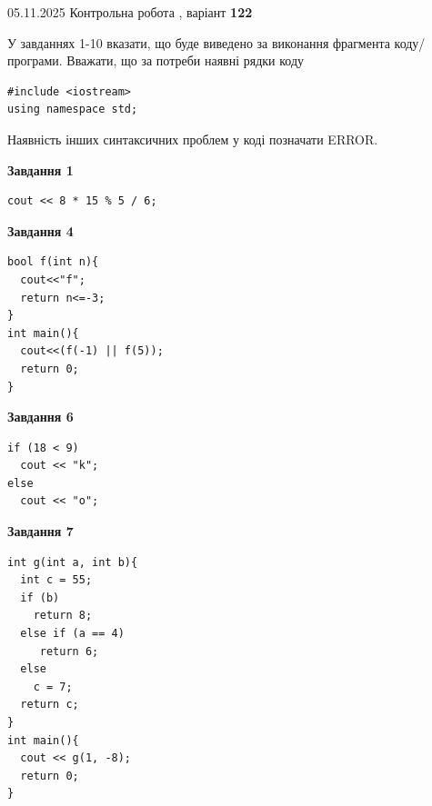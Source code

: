 \documentclass[12pt, ukrainian]{article}
\begin{document}
{\Large{05.11.2025 Контрольна робота , варіант  \No \textbf { 122 }\par}}
{
\begin {large}
У завданнях 1-10 вказати, що буде виведено за виконання фрагмента коду/про\-гра\-ми.
Вважати, що за потреби наявні рядки коду
\begin{verbatim}
#include <iostream>
using namespace std;
\end{verbatim}
Наявність інших синтаксичних проблем у коді позначати ERROR.

\begin{minipage}[t]{7.0cm}

\begin{center}
\textbf{Завдання 1}
\end{center}
\vspace{-8mm}

\begin{verbatim}
cout << 8 * 15 % 5 / 6;
\end{verbatim}



\begin{center}
\textbf{Завдання 4}
\end{center}
\vspace{-8mm}

\begin{verbatim}
bool f(int n){
  cout<<"f";
  return n<=-3;
}
int main(){
  cout<<(f(-1) || f(5));
  return 0;
}
\end{verbatim}



\begin{center}
\textbf{Завдання 6}
\end{center}
\vspace{-8mm}

\begin{verbatim}
if (18 < 9)
  cout << "k";
else
  cout << "o";
\end{verbatim}



\begin{center}
\textbf{Завдання 7}
\end{center}
\vspace{-8mm}

\begin{verbatim}
int g(int a, int b){
  int c = 55;
  if (b)
    return 8;
  else if (a == 4)
     return 6;
  else
    c = 7;
  return c;
}
int main(){
  cout << g(1, -8);
  return 0;
}
\end{verbatim}


\end{minipage}
\end{large}}
\end{document}
